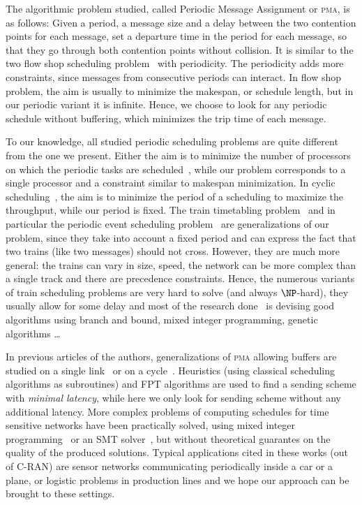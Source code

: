 \documentclass[a4paper,UKenglish,cleveref, autoref, thm-restate]{lipics-v2019}
\newcommand\pma{\textsc{pma}\xspace}
\begin{document}
The algorithmic problem studied, called Periodic Message Assignment or \pma, is as follows:
Given a period, a message size and a delay between the two contention points for each message, set a departure time in the period for each message, so that they go through both contention points without collision. It is similar to the two flow shop scheduling problem~\cite{yu2004minimizing} with periodicity. The periodicity adds more constraints, since messages from consecutive periods can interact. In flow shop problem, the aim is usually to minimize the makespan, or schedule length, but in our periodic variant it is infinite. Hence, we choose to look for any periodic schedule without buffering, which minimizes the trip time of each message. 


 To our knowledge, all studied periodic scheduling problems are quite different from the one we present.
Either the aim is to minimize the number of processors on which the periodic tasks are scheduled~\cite{korst1991periodic,hanen1993cyclic}, while our problem corresponds to a single processor and a constraint similar to makespan minimization. In cyclic scheduling~\cite{levner2010complexity}, the aim is to minimize the period of a scheduling to maximize the throughput, while our period is fixed. The train timetabling problem~\cite{lusby2011railway} and in particular the periodic event scheduling problem~\cite{serafini1989mathematical} are generalizations of our problem, since they take into account 
a fixed period and can express the fact that two trains (like two messages) should not cross. However, they are much more general: the trains can vary in size, speed, the network can be more complex than a single track and there are precedence constraints. Hence, the numerous variants of train scheduling problems are very hard to solve (and always $\NP$-hard), they usually allow for some delay and most of the research done~\cite{lusby2011railway} is devising good algorithms using branch and bound, mixed integer programming, genetic algorithms \dots

In previous articles of the authors, generalizations of \pma allowing buffers are studied on a single link~\cite{dominique2018deterministic} or on a cycle~\cite{Guir1905:Deterministic}. Heuristics (using classical scheduling algorithms as subroutines) and FPT algorithms are used to find a sending scheme with \emph{minimal latency}, while here we only look for sending scheme without any additional latency. More complex problems of computing schedules for time sensitive networks have been practically solved, using mixed integer programming~\cite{nayak2017incremental,steiner2018traffic} or an SMT solver~\cite{dos2019tsnsched}, but without theoretical guarantes on the quality of the produced solutions. Typical applications cited in these works (out of C-RAN) are sensor networks communicating periodically inside a car or a plane, or logistic problems in production lines and we hope our approach can be brought to these settings.
\end{document}
